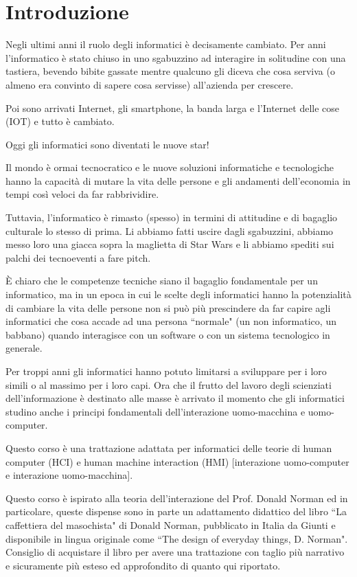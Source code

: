 \chapter{Introduzione}

Negli ultimi anni il ruolo degli informatici \`e decisamente cambiato. Per anni l'informatico \`e stato chiuso in uno sgabuzzino ad interagire in
solitudine con una tastiera, bevendo bibite gassate mentre qualcuno gli diceva che cosa serviva (o almeno era convinto di sapere cosa servisse)
all'azienda per crescere.

Poi sono arrivati Internet, gli smartphone, la banda larga e l'Internet delle cose (IOT) e tutto \`e cambiato. 

Oggi gli informatici sono diventati le nuove star! 

Il mondo \`e ormai tecnocratico e le nuove soluzioni informatiche e tecnologiche hanno la capacit\`a di mutare la vita delle persone e gli andamenti
dell'economia in tempi così veloci da far rabbrividire.

Tuttavia, l'informatico \`e rimasto (spesso) in termini di attitudine e di bagaglio culturale lo stesso di prima. Li abbiamo fatti uscire dagli
sgabuzzini, abbiamo messo loro una giacca sopra la maglietta di Star Wars e li abbiamo spediti sui palchi dei tecnoeventi a fare pitch.

\`E chiaro che le competenze tecniche siano il bagaglio fondamentale per un informatico, ma in un epoca in cui le scelte degli informatici hanno
la potenzialit\`a di cambiare la vita delle persone non si può più prescindere da far capire agli informatici che cosa accade ad una persona ``normale"
(un non informatico, un babbano) quando interagisce con un software o con un sistema tecnologico in generale. 

Per troppi anni gli informatici hanno potuto limitarsi a sviluppare per i loro simili o al massimo per i loro capi. Ora che il frutto del lavoro
degli scienziati dell'informazione \`e destinato alle masse \`e arrivato il momento che gli informatici studino anche i principi fondamentali
dell'interazione uomo-macchina e uomo-computer.

Questo corso \`e una trattazione adattata per informatici delle teorie di human computer (HCI) e human machine interaction (HMI) [interazione
uomo-computer e interazione uomo-macchina]. 

Questo corso \`e ispirato alla teoria dell'interazione del Prof. Donald Norman ed in particolare, queste dispense sono in parte un adattamento didattico
del libro ``La caffettiera del masochista" di Donald Norman, pubblicato in Italia da Giunti e disponibile in lingua originale come ``The design of
everyday things, D. Norman". Consiglio di acquistare il libro per avere una trattazione con taglio più narrativo e sicuramente più esteso ed
approfondito di quanto qui riportato.


